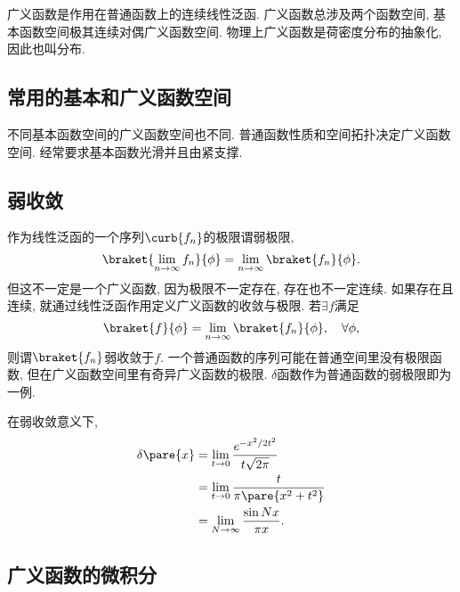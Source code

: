 \documentclass[hidelinks]{ctexart}
\begin{document}
\newpoint{}广义函数是作用在普通函数上的连续线性泛函.
\newpoint{}广义函数总涉及两个函数空间, 基本函数空间极其连续对偶广义函数空间.
\newpoint{}物理上广义函数是荷密度分布的抽象化, 因此也叫分布.


\subsection{常用的基本和广义函数空间} %
\label{sub:常用的基本和广义函数空间}

\newpoint{}不同基本函数空间的广义函数空间也不同.
\newpoint{}普通函数性质和空间拓扑决定广义函数空间.
\newpoint{}经常要求基本函数光滑并且由紧支撑.


\subsection{弱收敛} %
\label{sub:弱收敛}

\newpoint{}作为线性泛函的一个序列$\curb{f_n}$的极限谓弱极限,
\[ \braket{\lim_{n\rightarrow \infty} f_n}{\phi} = \lim_{n\rightarrow \infty}\braket{f_n}{\phi}. \]
\newpoint{}但这不一定是一个广义函数, 因为极限不一定存在, 存在也不一定连续.
\newpoint{}如果存在且连续, 就通过线性泛函作用定义广义函数的收敛与极限. 若$\exists f$满足
\[ \braket{f}{\phi} = \lim_{n\rightarrow \infty}\braket{f_n}{\phi},\quad \forall \phi, \]
则谓$\braket{f_n}$弱收敛于$f$.
\newpoint{}一个普通函数的序列可能在普通空间里没有极限函数, 但在广义函数空间里有奇异广义函数的极限.
\newpoint{}$\delta$函数作为普通函数的弱极限即为一例.
\begin{ex}
    在弱收敛意义下,
    \begin{align*}
        \delta\pare{x} &= \lim_{t\rightarrow 0} \frac{e^{-x^2/2t^2}}{t\sqrt{2\pi}} \\
        &= \lim_{t\rightarrow 0} \frac{t}{\pi\pare{x^2 + t^2}} \\
        &= \lim_{N\rightarrow \infty} \frac{\sin Nx}{\pi x}.
    \end{align*}
\end{ex}


\subsection{广义函数的微积分} %
\label{sub:广义函数的微积分}
\end{document}
